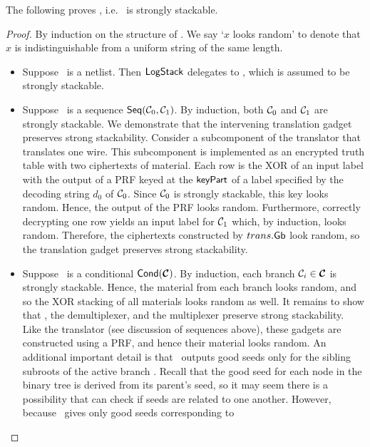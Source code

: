 The following proves , i.e. \ourschemelong\ is
strongly stackable.
\begin{proof}
  By induction on the structure of \cir.
  We say `$x$ looks random' to denote that $x$ is indistinguishable from a uniform string of the same length.
  \begin{itemize}
    \item Suppose \cir\ is a netlist.
      Then $\textsf{LogStack}$ delegates to \underscheme,
      which is assumed to be strongly stackable.
    \item Suppose \cir\ is a sequence $\textsf{Seq}(\mathcal C_0, \mathcal C_1)$.
      By induction,
      both $\mathcal C_0$ and $\mathcal C_1$ are strongly stackable.
      We demonstrate that the intervening translation
      gadget preserves strong stackability.
      Consider a subcomponent of the translator that translates one wire.
      This subcomponent is implemented as an encrypted truth table with two ciphertexts of material.
      Each row is the XOR of an input label with the
      output
      of a PRF keyed at the $\textsf{keyPart}$ of a label specified by the
      decoding string $d_0$ of $\mathcal C_0$.
      Since $\mathcal C_0$ is strongly stackable, this key looks random.
      Hence, the output of the PRF looks random.
      Furthermore, correctly decrypting one row yields an
      input label for $\mathcal C_1$ which, by induction, looks random.
      Therefore, the ciphertexts constructed by $trans.\textsf{Gb}$
      look random, so the translation gadget preserves strong stackability.
    \item Suppose \cir\ is a conditional $\conditional(\vec \cir)$.
      By induction, each branch $\cir_i \in \vec \cir$ is strongly
      stackable.
      Hence, the material from each branch looks random, and so the
      XOR stacking of all materials looks random as well.
      It remains to show that \gadget, the demultiplexer, and the multiplexer
      preserve strong stackability.
      Like the translator (see discussion of sequences
      above), these gadgets are constructed using a PRF, and hence
      their material looks random.
      An additional important detail is that \gadget\ outputs good
      seeds only for the sibling subroots of the active branch \aid.
      Recall that the good seed for each node in the binary
      tree is derived from its parent's seed, so it may seem there is
      a possibility that \E can check if seeds are related to one
      another.
      However, because \gadget\ gives only good seeds corresponding to

\end{itemize}
\end{proof}

